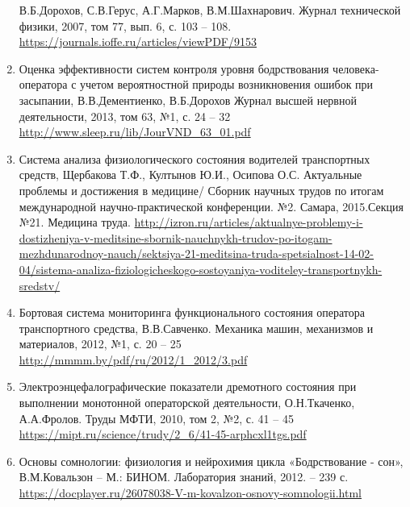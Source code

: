 \begin{enumerate}
    В.Б.Дорохов, С.В.Герус, А.Г.Марков, В.М.Шахнарович. Журнал технической физики, 2007, том 77, вып. 6, с. 103 – 108.
    \url{https://journals.ioffe.ru/articles/viewPDF/9153}
    \item Оценка эффективности систем контроля уровня бодрствования человека-оператора с учетом вероятностной природы возникновения ошибок при засыпании, В.В.Дементиенко, В.Б.Дорохов
    Журнал высшей нервной деятельности, 2013, том 63, №1, с. 24 – 32
    \url{http://www.sleep.ru/lib/JourVND_63_01.pdf}
    \item Система анализа физиологического состояния водителей транспортных средств, Щербакова Т.Ф., Култынов Ю.И., Осипова О.С. Актуальные проблемы и достижения в медицине/ Сборник научных трудов по итогам международной научно-практической конференции. №2. Самара, 2015.Секция №21. Медицина труда.
    \url{http://izron.ru/articles/aktualnye-problemy-i-dostizheniya-v-meditsine-sbornik-nauchnykh-trudov-po-itogam-mezhdunarodnoy-nauch/sektsiya-21-meditsina-truda-spetsialnost-14-02-04/sistema-analiza-fiziologicheskogo-sostoyaniya-voditeley-transportnykh-sredstv/}
    \item Бортовая система мониторинга функционального состояния оператора транспортного средства, В.В.Савченко. Механика машин, механизмов и материалов, 2012, №1,  с. 20 – 25
    \url{http://mmmm.by/pdf/ru/2012/1_2012/3.pdf}
    \item Электроэнцефалографические показатели дремотного состояния при выполнении монотонной операторской деятельности, О.Н.Ткаченко, А.А.Фролов. Труды МФТИ, 2010, том 2, №2, с. 41 – 45
    \url{https://mipt.ru/science/trudy/2_6/41-45-arphcxl1tgs.pdf}
    \item Основы сомнологии: физиология и нейрохимия цикла «Бодрствование - сон», В.М.Ковальзон – М.: БИНОМ. Лаборатория знаний, 2012. – 239 с.
    \url{https://docplayer.ru/26078038-V-m-kovalzon-osnovy-somnologii.html} 
\end{enumerate}